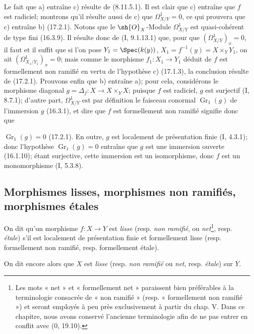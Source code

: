Le fait que a) entraîne c) résulte de (8.11.5.1). Il est clair que c) entraîne que $f$ est radiciel; montrons qu'il résulte aussi de c) que $\Omega_{X/Y}^1=0$, ce qui prouvera que c) entraîne b) (17.2.1). Notons que le $\sh{O}_X$-Module $\Omega_{X/Y}^1$ est quasi-cohérent de type fini (16.3.9). Il résulte donc de (I, 9.1.13.1) que, pour que $(\Omega_{X/Y}^1)_x=0$, il faut et il suffit que si l'on pose $Y_1=\Spec(k(y))$, $X_1=f^{-1}(y)=X\times_Y Y_1$, on ait $(\Omega_{X_1/Y_1}^1)_x=0$; mais comme le morphisme $f_1:X_1\to Y_1$ déduit de $f$ est formellement non ramifié en vertu de l'hypothèse c) (17.1.3), la conclusion résulte de (17.2.1). Prouvons enfin que b) entraîne a); pour cela, considérons le morphisme diagonal $g=\Delta_f:X\to X\times_Y X$; puisque $f$ est radiciel, $g$ est surjectif (I, 8.7.1); d'autre part, $\Omega_{X/Y}^1$ est par définition le faisceau conormal $\mathop{Gr}\nolimits_1(g)$ de l'immersion $g$ (16.3.1), et dire que $f$ est formellement non ramifié signifie donc que

$\mathop{Gr}\nolimits_1(g)=0$ (17.2.1). En outre, $g$ est localement de présentation finie (I, 4.3.1); donc l'hypothèse $\mathop{Gr}\nolimits_1(g)=0$ entraîne que $g$ est une immersion ouverte (16.1.10); étant surjective, cette immersion est un isomorphisme, donc $f$ est un monomorphisme (I, 5.3.8).

\subsection{Morphismes lisses, morphismes non ramifiés, morphismes étales}
\label{subsection:IV.17.3}

\begin{definition}[17.3.1]
\label{IV.17.3.1}
On dit qu'un morphisme $f:X\to Y$ est \emph{lisse} (resp. \emph{non ramifié}, ou \emph{net}\footnote{Les mots « net » et « formellement net » paraissent bien préférables à la terminologie consacrée de « non ramifié » (resp. « formellement non ramifié ») et seront employés à peu près exclusivement à partir du chap. V. Dans ce chapitre, nous avons conservé l'ancienne terminologie afin de ne pas entrer en conflit avec (0, 19.10).}, resp. \emph{étale}) s'il est localement de présentation finie et formellement lisse (resp. formellement non ramifié, resp. formellement étale).
\end{definition}

On dit encore alors que $X$ est \emph{lisse} (resp. \emph{non ramifié} ou \emph{net}, resp. \emph{étale}) sur $Y$.

